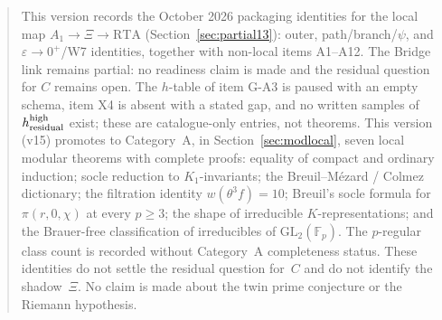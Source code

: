 \begin{abstract}
This version records the October 2026 packaging identities for the local map $A_1\to\Xi\to\mathrm{RTA}$ (Section~\ref{sec:partial13}): outer, path/branch/$\psi$, and $\varepsilon\to0^+$/W7 identities, together with non-local items A1--A12. The Bridge link remains partial: no readiness claim is made and the residual question for $C$ remains open. The $h$-table of item G-A3 is paused with an empty schema, item X4 is absent with a stated gap, and no written samples of $h_{\rm residual}^{\rm high}$ exist; these are catalogue-only entries, not theorems.
This version (v15) promotes to Category~A, in Section~\ref{sec:modlocal}, seven local modular theorems with complete proofs: equality of compact and ordinary induction; socle reduction to $K_1$-invariants; the Breuil--M\'ezard / Colmez dictionary; the filtration identity $w(\theta^3 f)=10$; Breuil's socle formula for $\pi(r,0,\chi)$ at every $p\ge3$; the shape of irreducible $K$-representations; and the Brauer-free classification of irreducibles of $\mathrm{GL}_2(\mathbb{F}_p)$. The $p$-regular class count is recorded without Category~A completeness status. These identities do not settle the residual question for~$C$ and do not identify the shadow~$\Xi$. No claim is made about the twin prime conjecture or the Riemann hypothesis.
\end{abstract}
\tableofcontents
\clearpage

